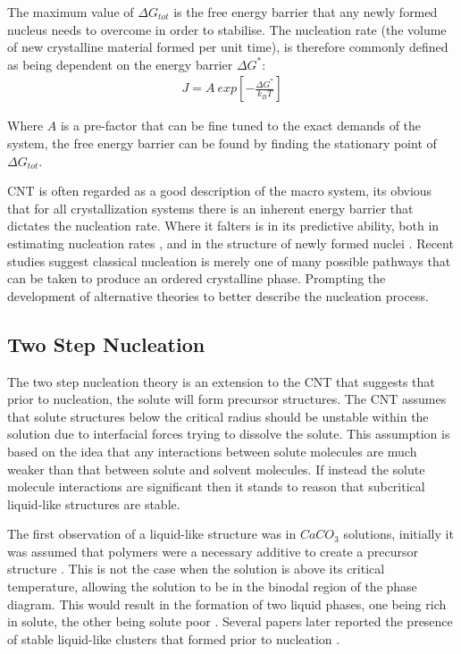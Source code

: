 The maximum value of $\Delta G_{tot}$ is the free energy barrier 
that any newly formed nucleus needs to overcome in order to stabilise. 
The nucleation rate (the volume of new crystalline material formed per 
unit time), is therefore commonly defined as being dependent on the 
energy barrier $\Delta G^*$:
\begin{align}
	J = A \ exp \left[-\frac{\Delta G^*}{k_BT} \right]
\end{align}

Where $A$ is a pre-factor that can be fine tuned to the exact 
demands of the system, the free energy barrier can be found by 
finding the stationary point of $\Delta G_{tot}$. 

CNT is often regarded as a good description of the macro system, 
its obvious that for all crystallization systems there is an 
inherent energy barrier that dictates the nucleation rate. 
Where it falters is in its predictive ability, both in estimating 
nucleation rates \cite{Gharibeh2005, Vekilov2010}, and in the 
structure of newly formed nuclei \cite{Lee1999, Yau2001}.
Recent studies suggest classical nucleation is merely one of 
many possible pathways that can be taken to produce an ordered 
crystalline phase. Prompting the development of alternative 
theories to better describe the nucleation process.

\subsection{Two Step Nucleation}
The two step nucleation theory is an extension to the CNT 
that suggests that prior to nucleation, the solute will 
form precursor structures. The CNT assumes that solute 
structures below the critical radius should be unstable 
within the solution due to interfacial forces trying to 
dissolve the solute. This assumption is based on the idea 
that any interactions between solute molecules are much
weaker than that between solute and solvent molecules.
If instead the solute molecule interactions are significant
then it stands to reason that subcritical liquid-like 
structures are stable. 

The first observation of a liquid-like structure was in 
$CaCO_3$ solutions, initially it was assumed that polymers
were a necessary additive to create a precursor structure 
\cite{Driessche2017, Karthika2016}. This is not the case when 
the solution is above its critical temperature, allowing the 
solution to be in the binodal region of the phase diagram. 
This would result in the formation of two liquid phases, 
one being rich in solute, the other being solute poor 
\cite{Karthika2016, Fu2021}. Several papers later reported 
the presence of stable liquid-like clusters that formed 
prior to nucleation \cite{Savage2009, Wolde1997, Soga1999}. 

